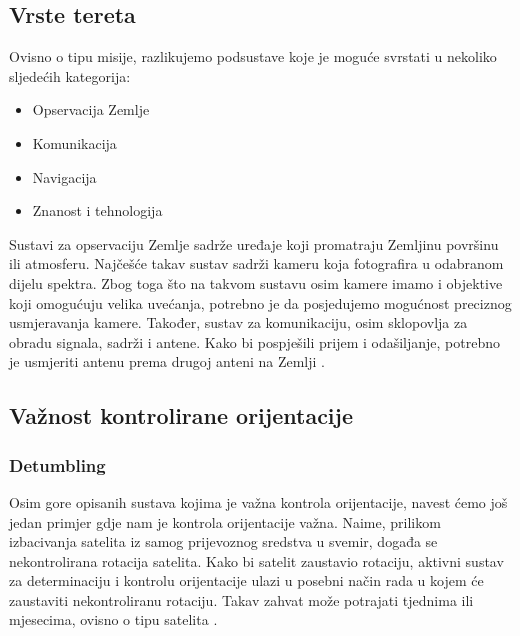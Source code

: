 \documentclass[times, utf8, diplomski, numeric]{templates/template}
\begin{document}
{{        \subsection{Vrste tereta}{
            Ovisno o tipu misije, razlikujemo podsustave koje je moguće svrstati u nekoliko sljedećih kategorija:

            \begin{itemize}
                \item Opservacija Zemlje
                \item Komunikacija
                \item Navigacija
                \item Znanost i tehnologija
            \end{itemize}

            Sustavi za opservaciju Zemlje sadrže uređaje koji promatraju Zemljinu površinu ili atmosferu. Najčešće takav sustav sadrži kameru koja fotografira u odabranom dijelu spektra. Zbog toga što na takvom sustavu osim kamere imamo i objektive koji omogućuju velika uvećanja, potrebno je da posjedujemo mogućnost preciznog usmjeravanja kamere. Također, sustav za komunikaciju, osim sklopovlja za obradu signala, sadrži i antene. Kako bi pospješili prijem i odašiljanje, potrebno je usmjeriti antenu prema drugoj anteni na Zemlji \cite{sattelitePayload}.

            \subsection{Važnost kontrolirane orijentacije}{
                \subsubsection{Detumbling}{
                    Osim gore opisanih sustava kojima je važna kontrola orijentacije, navest ćemo još jedan primjer gdje nam je kontrola orijentacije važna. Naime, prilikom izbacivanja satelita iz samog prijevoznog sredstva u svemir, događa se nekontrolirana rotacija satelita. Kako bi satelit zaustavio rotaciju, aktivni sustav za determinaciju i kontrolu orijentacije  ulazi u posebni način rada  u kojem će zaustaviti nekontroliranu rotaciju. Takav zahvat može potrajati tjednima ili mjesecima, ovisno o tipu satelita \cite{fersat}.
                }

}}}}
\end{document}
